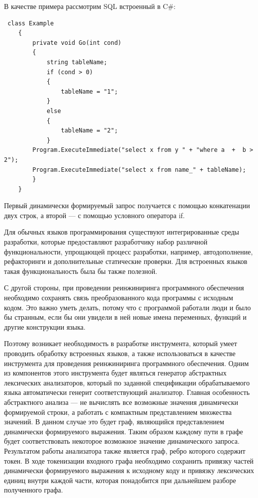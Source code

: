 \documentclass{matmex-diploma}
\begin{document}
В качестве примера рассмотрим SQL встроенный в C\#:

\begin{verbatim}
 class Example
    {
        private void Go(int cond)
        {
            string tableName;
            if (cond > 0)
            {
                tableName = "1";
            }
            else
            {
                tableName = "2";
            }
        Program.ExecuteImmediate("select x from y " + "where a  +  b > 2");
        Program.ExecuteImmediate("select x from name_" + tableName);
        }
    }
\end{verbatim}

Первый динамически формируемый запрос получается с помощью конкатенации двух строк, а второй --- с помощью условного оператора if.

Для обычных языков программирования существуют интегрированные среды разработки, которые предоставляют разработчику набор различной 
функциональности, упрощающей процесс разработки, например, автодополнение, рефакторинги и дополнительные статические проверки.
Для встроенных языков такая функциональность была бы также полезной.

С другой стороны, при проведении реинжиниринга программного обеспечения необходимо сохранять связь преобразованного кода программы
с исходным кодом.  Это важно уметь делать, потому что с  программой работали люди и было бы странным, если бы они увидели в ней новые 
имена переменных, функций и другие конструкции языка.  

Поэтому возникает необходимость в разработке инструмента, который умеет проводить обработку встроенных языков, а также использоваться
в качестве инструмента для проведения реинжиниринга программного обеспечения. Одним из компонентов этого инструмента будет 
являться генератор абстрактных лексических анализаторов, который по заданной спецификации обрабатываемого языка автоматически генерит 
соответствующий  анализатор. Главная особенность абстрактного анализа –-- не вычислять все возможные значения динамически формируемой 
строки, а работать с компактным представлением множества значений.   В данном случае это будет граф, являющийся представлением динамически 
формируемого выражения.  Таким образом каждому пути в графе будет соответствовать некоторое возможное значение динамического запроса.
Результатом работы анализатора также является граф, ребро которого содержит токен. В ходе токенизации входного графа необходимо сохранить 
привязку частей динамически формируемого выражения к исходному коду и привязку лексических единиц внутри каждой части, которая понадобится 
при дальнейшем разборе полученного графа. 
\end{document}
